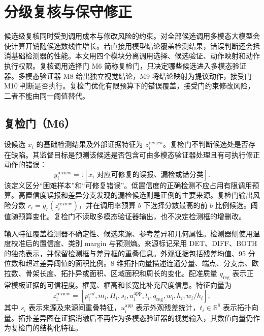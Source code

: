 \section{分级复核与保守修正}
\label{sec:gating}

候选级复核同时受到调用成本与修改风险的约束。对全部候选调用多模态大模型会使计算开销随候选数线性增长。若直接用模型结论覆盖检测结果，错误判断还会抵消基础检测器的性能。本文用四个模块分离调用选择、候选验证、动作映射和动作执行权限。复核调用选择门 M6 简称复检门，只决定哪些候选进入多模态验证器。多模态验证器 M8 给出独立视觉结论，M9 将结论映射为提议动作，接受门 M10 判断是否执行。复检门优化有限预算下的错误覆盖，接受门约束修改风险，二者不能由同一阈值替代。

\subsection{复检门（M6）}
\label{subsec:review-gate}

设候选 $x_i$ 的基础检测结果及外部证据特征为 $z_i^{\mathrm{review}}$。复检门不判断候选处是否存在缺陷。其监督目标是预测该候选是否包含可由多模态验证器处理且有可执行修正动作的错误：
\begin{equation}
 y_i^{\mathrm{review}}=
 \mathbb{I}\!\left[x_i\text{ 对应可修复的误报、漏检或错分类}\right].
 \label{eq:review-label}
\end{equation}
该定义区分“困难样本”和“可修复错误”。低置信度的正确检测不应占用有限调用预算。高置信度误报和差异分支发现的漏检候选则是正例的主要来源。复检门输出风险分数 $r_i=g_r(z_i^{\mathrm{review}})$，并在调用率预算 $b$ 下选择分数最高的前 $b$ 比例候选。阈值随预算变化。复检门不读取多模态验证器输出，也不决定检测框的增删改。

输入特征覆盖检测器不确定性、候选来源、参考差异和几何属性。检测器侧使用温度校准后的置信度、类别 margin 与预测熵。来源标记采用 DET、DIFF、BOTH 的独热表示，并保留检测框与差异框的重叠信息。外观证据包括残差均值、95 分位数和超过差异阈值的面积比例。8 维拓扑向量描述连通分量、端点、分支点、欧拉数、骨架长度、拓扑异或面积、区域面积和周长的变化。配准质量 $q_{\mathrm{reg}}$ 表示正常模板证据的可信程度。框宽、框高和长宽比补充尺度信息。特征向量为
\begin{equation}
 z_i^{\mathrm{review}}=[p_i^{cal},m_i,H_i,s_i,u_i^{\mathrm{app}},t_i,q_{\mathrm{reg}},w_i,h_i,w_i/h_i],
 \label{eq:review-features}
\end{equation}
其中 $s_i$ 表示来源及来源间重叠特征，$u_i^{\mathrm{app}}$ 表示外观残差统计，$t_i\in\mathbb{R}^{8}$ 表示拓扑向量。拓扑差异图在证据消融后不再作为多模态验证器的视觉输入，其数值向量仍作为复检门的结构化特征。

